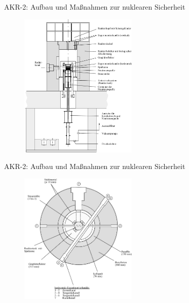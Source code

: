\documentclass[10pt]{beamer}
\begin{document}
	\begin{frame}{AKR-2: Aufbau und Maßnahmen zur nuklearen Sicherheit}
		\begin{figure}[ht]
			\centering
			\includegraphics[width=0.5\textwidth]{pic/Vertikalquerschnitt_Reaktor.pdf}\\
		\end{figure}	
	\end{frame}
	
	\begin{frame}{AKR-2: Aufbau und Maßnahmen zur nuklearen Sicherheit}
			\begin{figure}[ht]
				\centering
				\includegraphics[width=0.5\textwidth]{pic/Horizontalquerschnitt_Reaktor}\\
			\end{figure}	
	\end{frame}
\end{document}
